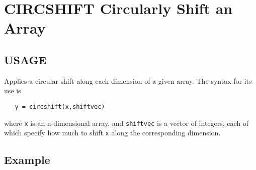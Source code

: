 \section{CIRCSHIFT Circularly Shift an Array}

\subsection{USAGE}

Applies a circular shift along each dimension of a given array.  The
syntax for its use is
\begin{verbatim}
   y = circshift(x,shiftvec)
\end{verbatim}
where \verb|x| is an n-dimensional array, and \verb|shiftvec| is a vector of
integers, each of which specify how much to shift \verb|x| along the
corresponding dimension.  
\subsection{Example}

